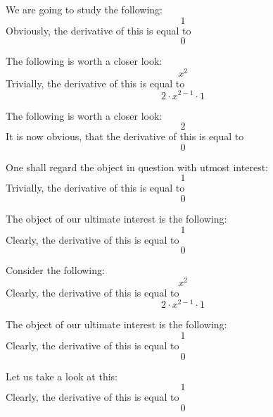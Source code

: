 \documentclass{article}
\begin{document}
We are going to study the following:
\begin{equation}
1 
\end{equation}
Obviously, the derivative of this is equal to
\begin{equation}
0 
\end{equation}

The following is worth a closer look:
\begin{equation}
x ^{2 } 
\end{equation}
Trivially, the derivative of this is equal to
\begin{equation}
2 \cdot x ^{2 - 1 } \cdot 1 
\end{equation}

The following is worth a closer look:
\begin{equation}
2 
\end{equation}
It is now obvious, that the derivative of this is equal to
\begin{equation}
0 
\end{equation}

One shall regard the object in question with utmost interest:
\begin{equation}
1 
\end{equation}
Trivially, the derivative of this is equal to
\begin{equation}
0 
\end{equation}

The object of our ultimate interest is the following:
\begin{equation}
1 
\end{equation}
Clearly, the derivative of this is equal to
\begin{equation}
0 
\end{equation}

Consider the following:
\begin{equation}
x ^{2 } 
\end{equation}
Clearly, the derivative of this is equal to
\begin{equation}
2 \cdot x ^{2 - 1 } \cdot 1 
\end{equation}

The object of our ultimate interest is the following:
\begin{equation}
1 
\end{equation}
Clearly, the derivative of this is equal to
\begin{equation}
0 
\end{equation}

Let us take a look at this:
\begin{equation}
1 
\end{equation}
Clearly, the derivative of this is equal to
\begin{equation}
0 
\end{equation}
\end{document}
